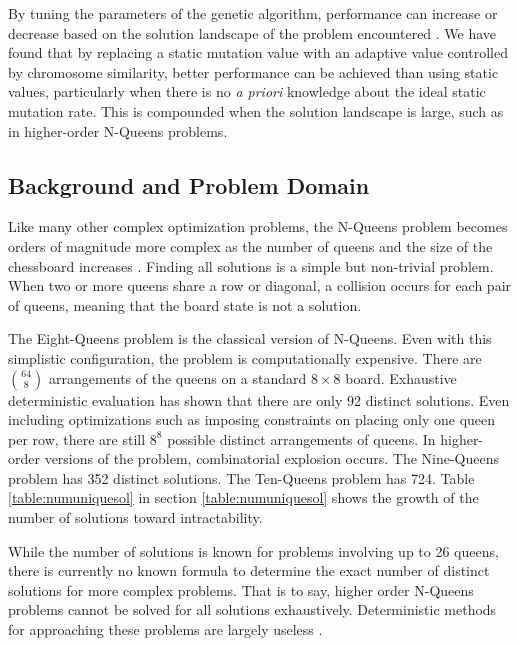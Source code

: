 \documentclass{sig-alternate}
\begin{document}
By tuning the parameters of the genetic algorithm, performance can increase or decrease based on the solution landscape of the problem encountered \cite{ye2010some,coyne1994genetic,srinivas1994adaptive}. We have found that by replacing a static mutation value with an adaptive value controlled by chromosome similarity, better performance can be achieved than using static values, particularly when there is no \emph{a priori} knowledge about the ideal static mutation rate. This is compounded when the solution landscape is large, such as in higher-order N-Queens problems.

\subsection{Background and Problem Domain}
Like many other complex optimization problems, the N-Queens problem becomes orders of magnitude more complex as the number of queens and the size of the chessboard increases \cite{homaifar1992queens}. Finding all solutions is a simple but non-trivial problem. When two or more queens share a row or diagonal, a collision occurs for each pair of queens, meaning that the board state is not a solution.

The Eight-Queens problem is the classical version of N-Queens. Even with this simplistic configuration, the problem is computationally expensive. There are {$64 \choose 8$} arrangements of the queens on a standard {$8\times{}8$} board. Exhaustive deterministic evaluation has shown that there are only 92 distinct solutions. Even including optimizations such as imposing constraints on placing only one queen per row, there are still {$8^8$} possible distinct arrangements of queens. In higher-order versions of the problem, combinatorial explosion occurs. The Nine-Queens problem has 352 distinct solutions. The Ten-Queens problem has 724. Table \ref{table:numuniquesol} in section \ref{table:numuniquesol} shows the growth of the number of solutions toward intractability. 

While the number of solutions is known for problems involving up to 26 queens, there is currently no known formula to determine the exact number of distinct solutions for more complex problems. That is to say, higher order N-Queens problems cannot be solved for all solutions exhaustively. Deterministic methods for approaching these problems are largely useless \cite{crawford1992solving}.
\end{document}
